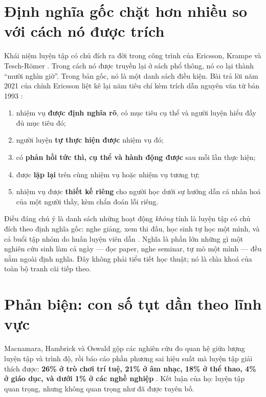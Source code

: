 \documentclass[../hieu-suat.tex]{subfiles}
\begin{document}
\section{Định nghĩa gốc chặt hơn nhiều so với cách nó được trích}

Khái niệm luyện tập có chủ đích ra đời trong công trình của Ericsson, Krampe và Tesch-Römer \cite{ericsson1993}. Trong cách nó được truyền lại ở sách phổ thông, nó co lại thành ``mười nghìn giờ''. Trong bản gốc, nó là một danh sách điều kiện. Bài trả lời năm 2021 của chính Ericsson liệt kê lại năm tiêu chí kèm trích dẫn nguyên văn từ bản 1993 \cite[tr.~1114--1120]{ericsson2021} \nT{}:

\begin{enumerate}
\item nhiệm vụ \textbf{được định nghĩa rõ}, có mục tiêu cụ thể và người luyện hiểu đầy đủ mục tiêu đó;
\item người luyện \textbf{tự thực hiện được} nhiệm vụ đó;
\item có \textbf{phản hồi tức thì, cụ thể và hành động được} sau mỗi lần thực hiện;
\item được \textbf{lặp lại} trên cùng nhiệm vụ hoặc nhiệm vụ tương tự;
\item nhiệm vụ được \textbf{thiết kế riêng} cho người học dưới sự hướng dẫn cá nhân hoá của một người thầy, kèm chẩn đoán lỗi riêng.
\end{enumerate}

Điều đáng chú ý là danh sách những hoạt động \emph{không} tính là luyện tập có chủ đích theo định nghĩa gốc: nghe giảng, xem thi đấu, học sinh tự học một mình, và cả buổi tập nhóm do huấn luyện viên dẫn \cite{ericsson2021} \nT{}. Nghĩa là phần lớn những gì một nghiên cứu sinh làm cả ngày --- đọc paper, nghe seminar, tự mò một mình --- đều nằm ngoài định nghĩa. Đây không phải tiểu tiết học thuật; nó là chìa khoá của toàn bộ tranh cãi tiếp theo.

\section{Phản biện: con số tụt dần theo lĩnh vực}

Macnamara, Hambrick và Oswald \cite{macnamara2014} gộp các nghiên cứu đo quan hệ giữa lượng luyện tập và trình độ, rồi báo cáo phần phương sai hiệu suất mà luyện tập giải thích được: \textbf{26\% ở trò chơi trí tuệ, 21\% ở âm nhạc, 18\% ở thể thao, 4\% ở giáo dục, và dưới 1\% ở các nghề nghiệp} \nD{}. Kết luận của họ: luyện tập quan trọng, nhưng không quan trọng như đã được tuyên bố.
\end{document}
